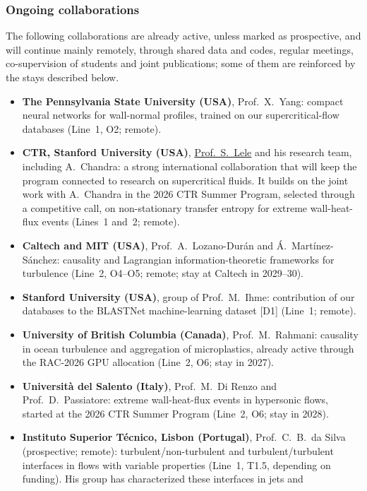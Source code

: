 \documentclass[11pt]{article}
\begin{document}
\subsubsection{Ongoing collaborations}
The following collaborations are already active, unless marked as prospective, and will continue mainly remotely, through shared
data and codes, regular meetings, co-supervision of students and joint publications; some of them
are reinforced by the stays described below.
\begin{itemize}
  \item \textbf{The Pennsylvania State University (USA)}, Prof.\ X.\ Yang: compact neural networks
  for wall-normal profiles, trained on our supercritical-flow databases (Line~1, O2; remote).
  \item \textbf{CTR, Stanford University (USA)},
  \href{https://me.stanford.edu/people/sanjiva-lele}{Prof.\ S.\ Lele} and his research team, including   A.\ Chandra: a strong international collaboration that will keep the program connected to research on supercritical fluids. It builds on the joint work with A.\ Chandra in the 2026 CTR Summer Program, selected through a competitive call, on non-stationary transfer entropy for extreme wall-heat-flux events (Lines~1 and~2; remote).
  \item \textbf{Caltech and MIT (USA)}, Prof.\ A.\ Lozano-Dur\'an and \'A.\ Mart\'inez-S\'anchez:   causality and Lagrangian information-theoretic frameworks for turbulence (Line~2, O4--O5; remote; stay at Caltech in 2029--30).
  \item \textbf{Stanford University (USA)}, group of Prof.\ M.\ Ihme: contribution of our databases to the BLASTNet machine-learning dataset [D1] (Line~1; remote).
  \item \textbf{University of British Columbia (Canada)}, Prof.\ M.\ Rahmani: causality in ocean turbulence and aggregation of microplastics, already active through the RAC-2026 GPU allocation (Line~2, O6; stay in 2027).
  \item \textbf{Universit\`a del Salento (Italy)}, Prof.\ M.\ Di Renzo and Prof.\ D.\ Passiatore:
  extreme wall-heat-flux events in hypersonic flows, started at the 2026 CTR Summer Program
  (Line~2, O6; stay in 2028).
  \item \textbf{Instituto Superior T\'ecnico, Lisbon (Portugal)}, Prof.\ C.\ B.\ da Silva
  (prospective; remote): turbulent/non-turbulent and turbulent/turbulent interfaces in flows with
  variable properties (Line~1, T1.5, depending on funding). His group has characterized these interfaces in jets and

\end{itemize}
\end{document}
